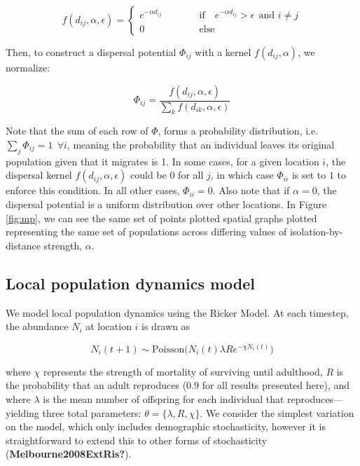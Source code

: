 \documentclass[10pt,oneside]{article}
\begin{document}
\[f(d_{ij}, \alpha, \epsilon) =  \begin{cases} e^{-\alpha d_{ij}}
\quad\quad\quad &\text{if}\quad e^{-\alpha d_{ij}} > \epsilon \ \
\text{and } i \neq j \\   0 &\text{else} \end{cases}\]

Then, to construct a dispersal potential \(\Phi_{ij}\) with a kernel
\(f(d_{ij}, \alpha)\), we normalize:

\[\Phi_{ij} = \frac{f(d_{ij}, \alpha, \epsilon)}{\sum_k
f(d_{ik},\alpha, \epsilon)}\]

Note that the sum of each row of \(\Phi\), forms a probability
distribution, i.e.~\(\sum_j \Phi_{ij} = 1 \ \ \forall i\), meaning the
probability that an individual leaves its original population given that
it migrates is 1. In some cases, for a given location \(i\), the
dispersal kernel \(f(d_{ij}, \alpha, \epsilon)\) could be \(0\) for all
\(j\), in which case \(\Phi_{ii}\) is set to \(1\) to enforce this
condition. In all other cases, \(\Phi_{ii}=0\). Also note that if
\(\alpha=0\), the dispersal potential is a uniform distribution over
other locations. In Figure \ref{fig:mp}, we can see the same set of
points plotted spatial graphs plotted representing the same set of
populations across differing values of isolation-by-distance strength,
\(\alpha\).

\hypertarget{local-population-dynamics-model}{%
\subsection{Local population dynamics
model}\label{local-population-dynamics-model}}

We model local population dynamics using the Ricker Model. At each
timestep, the abundance \(N_i\) at location \(i\) is drawn as

\[N_i(t+1) \sim \text{Poisson}\bigg(N_i(t) \lambda R e^{- \chi
N_i(t)}\bigg)\]

where \(\chi\) represents the strength of mortality of surviving until
adulthood, \(R\) is the probability that an adult reproduces (\(0.9\)
for all results presented here), and where \(\lambda\) is the mean
number of offspring for each individual that reproduces---yielding three
total parameters: \(\theta = \{\lambda, R, \chi \}\). We consider the
simplest variation on the model, which only includes demographic
stochasticity, however it is straightforward to extend this to other
forms of stochasticity (\textbf{Melbourne2008ExtRis?}).
\end{document}
